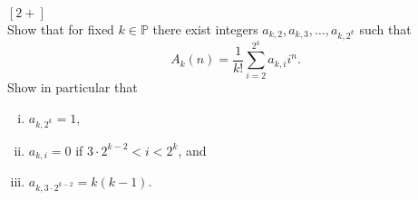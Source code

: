 \documentclass{article}
\newenvironment{problem}[2][Problem]{\begin{trivlist}
\item[\hskip \labelsep {\bfseries #1}\hskip \labelsep {\bfseries #2.}]}{\end{trivlist}}
\begin{document}
\pagebreak
\begin{problem}{14 (b)} $[2+]$ \\
  Show that for fixed $k \in \mathbb P$ there exist integers
  $a_{k,2},a_{k,3},\hdots,a_{k,2^k}$ such that \[
    A_k(n) = \frac{1}{k!} \sum_{i = 2}^{2^k} a_{k,i}i^n.
  \]
  Show in particular that \begin{enumerate}[(i)]
    \item $a_{k,2^k} = 1$,
    \item $a_{k,i} = 0$ if $3\cdot2^{k-2} < i < 2^k$, and
    \item $a_{k,3\cdot2^{k-2}} = k(k-1)$.
  \end{enumerate}
\end{problem}
\end{document}
